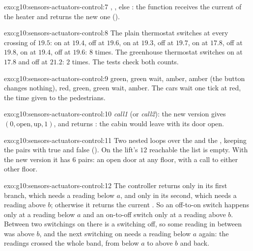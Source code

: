 \begin{solution}{exo:g10:sensors-actuators-control:7}
, , else : the function receives the
current  of the heater and returns the new one ().
\end{solution}

\begin{solution}{exo:g10:sensors-actuators-control:8}
The plain thermostat switches at every crossing of $19.5$: on at $19.4$, off at $19.6$, on at $19.3$, off at
$19.7$, on at $17.8$, off at $19.8$, on at $19.4$, off at $19.6$: $8$ times. The greenhouse thermostat switches on at
$17.8$ and off at $21.2$: $2$ times. The tests check both counts.
\end{solution}

\begin{solution}{exo:g10:sensors-actuators-control:9}
green, green wait, amber, amber (the button changes nothing), red, green, green wait, amber. The cars wait one tick at
red, the time given to the pedestrians.
\end{solution}

\begin{solution}{exo:g10:sensors-actuators-control:10}
\textit{call1} (or \textit{call2}): the new version gives $(0, \text{open}, \text{up}, 1)$, and  returns
: the cabin would leave with its door open.
\end{solution}

\begin{solution}{exo:g10:sensors-actuators-control:11}
Two nested loops over the  and the , keeping the pairs with  true and
 false (). On the lift's $12$ reachable  the list is
empty. With the new version it has $6$ pairs: an open door at any floor, with a call to either other floor.
\end{solution}

\begin{solution}{exo:g10:sensors-actuators-control:12}
The controller returns  only in its first branch, which needs a reading below $a$, and  only in
its second, which needs a reading above $b$; otherwise it returns the current . So an off-to-on switch happens
only at a reading below $a$ and an on-to-off switch only at a reading above $b$. Between two switchings on there is a
switching off, so some reading in between was above $b$, and the next switching on needs a reading below $a$ again:
the readings crossed the whole band, from below $a$ to above $b$ and back.
\end{solution}

